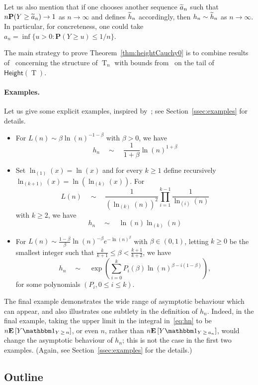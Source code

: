 \documentclass[10pt]{amsart}
\theoremstyle{definition}\newtheorem{defi}[theo]{Definition}\newtheorem{rema}[theo]{Remark}\newtheorem{exam}[theo]{Example}\newtheorem{exem}[theo]{Example}\newtheorem{nota}[theo]{Notation}
\renewcommand{\H}{\mathsf{Height}}
\newcommand{\p}{\mathbf{P}}
\newcommand{\E}[1]{{\mathbf E}\left[#1\right]}
\DeclareMathOperator{\rtree}{T}
\newcommand{\I}[1]{{\mathbbm 1}_{#1}}
\let\oldtilde\tilde
\renewcommand*{\tilde}[1]{\mathchoice{\widetilde{#1}}{\widetilde{#1}}{\oldtilde{#1}}{\oldtilde{#1}}}
\begin{document}
Let us also mention that if one chooses another sequence $\tilde{a}_n$ such that $n \p(Y \ge \tilde{a}_n) \to 1$ as $n \to \infty$ and defines $\tilde{h}_{n}$ accordingly, then $h_{n} \sim \tilde{h}_{n}$ as $n \rightarrow \infty$. In particular, for concreteness, one could take $a_{n}= \inf\{u >0: \p(Y \geq u) \leq 1/n\} $.

The main strategy to prove Theorem~\ref{thm:heightCauchy0} is to combine results of~\cite{KR19} concerning the structure of $\rtree_{n}$ with bounds from~\cite{NW07} on the tail of $\H(\rtree)$.


\paragraph{{Examples.}} Let us give some explicit examples, inspired by~\cite{NW07}; see Section~\ref{ssec:examples} for details.
\begin{itemize}
\item For $L(n) \sim \beta \ln(n)^{-1-\beta}$ with $\beta>0$, we have
\[
h_{n} \quad \sim \quad \frac{1}{1+\beta} \ln(n)^{1+\beta}
\]

\item Set $\ln_{(1)}(x)=\ln(x)$ and for every $k \geq 1$ define recursively $\ln_{(k+1)} (x) = \ln(\ln_{(k)}(x))$. For
\[
L(n) \quad \sim \quad \frac{1}{(\ln_{(k)}(n))^{2}} \prod_{i=1}^{k-1} \frac{1}{\ln_{(i)}(n) }
\]
with $k \geq 2$, we have
\[
h_{n} \quad \sim \quad \ln(n) \ln_{(k)}(n)
\]

\item For $L(n) \sim \frac{1-\beta}{\beta} \ln(n)^{-\beta} e^{-\ln(n)^{\beta}} $ with $\beta \in (0,1)$, letting $k \geq 0$ be the smallest integer such that $ \frac{k}{k+1} \leq \beta < \frac{k+1}{k+2}$, we have
\[
h_{n} \quad \sim \quad \exp \left(\sum_{i=0}^{k} P_{i}(\beta) \ln(n)^{\beta-i(1-\beta)} \right),
\]
for some polynomials $(P_i,0 \le i \le k)$.
\end{itemize}
The final example demonstrates the wide range of asymptotic behaviour which can appear, and also illustrates one subtlety in the definition of $h_n$. Indeed, in the final example, taking the upper limit in the integral in~\eqref{eq:hn} to be $n \E{Y\I{Y\,\ge\, n}}$, or even $n$, rather than $n \E{Y\I{Y\,\ge\,a_n}}$, would change the asymptotic behaviour of $h_n$; this is not the case in the first two examples. (Again, see Section~\ref{ssec:examples} for the details.)

\subsection*{Outline}
\end{document}
